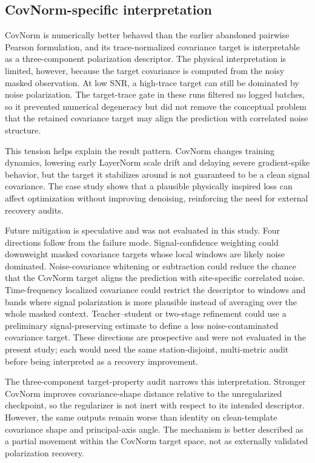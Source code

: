 \documentclass[review,12pt,authoryear]{elsarticle}
\begin{document}
\subsection{CovNorm-specific interpretation}
CovNorm is numerically better behaved than the earlier abandoned pairwise Pearson formulation, and its trace-normalized covariance target is interpretable as a three-component polarization descriptor. The physical interpretation is limited, however, because the target covariance is computed from the noisy masked observation. At low SNR, a high-trace target can still be dominated by noise polarization. The target-trace gate in these runs filtered no logged batches, so it prevented numerical degeneracy but did not remove the conceptual problem that the retained covariance target may align the prediction with correlated noise structure.

This tension helps explain the result pattern. CovNorm changes training dynamics, lowering early LayerNorm scale drift and delaying severe gradient-spike behavior, but the target it stabilizes around is not guaranteed to be a clean signal covariance. The case study shows that a plausible physically inspired loss can affect optimization without improving denoising, reinforcing the need for external recovery audits.

Future mitigation is speculative and was not evaluated in this study. Four directions follow from the failure mode. Signal-confidence weighting could downweight masked covariance targets whose local windows are likely noise dominated. Noise-covariance whitening or subtraction could reduce the chance that the CovNorm target aligns the prediction with site-specific correlated noise. Time-frequency localized covariance could restrict the descriptor to windows and bands where signal polarization is more plausible instead of averaging over the whole masked context. Teacher--student or two-stage refinement could use a preliminary signal-preserving estimate to define a less noise-contaminated covariance target. These directions are prospective and were not evaluated in the present study; each would need the same station-disjoint, multi-metric audit before being interpreted as a recovery improvement.

The three-component target-property audit narrows this interpretation. Stronger CovNorm improves covariance-shape distance relative to the unregularized checkpoint, so the regularizer is not inert with respect to its intended descriptor. However, the same outputs remain worse than identity on clean-template covariance shape and principal-axis angle. The mechanism is better described as a partial movement within the CovNorm target space, not as externally validated polarization recovery.
\end{document}
